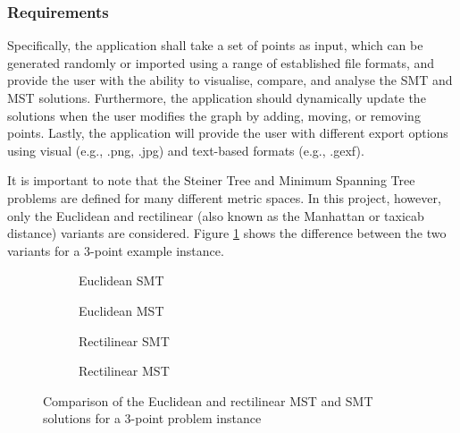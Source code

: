 \documentclass{l4proj}
\begin{document}
\subsubsection{Requirements}
Specifically, the application shall take a set of points as input, which can be generated randomly or imported using a range of established file formats, and provide the user with the ability to visualise, compare, and analyse the SMT and MST solutions.
Furthermore, the application should dynamically update the solutions when the user modifies the graph by adding, moving, or removing points.
Lastly, the application will provide the user with different export options using visual (e.g., .png, .jpg) and text-based formats (e.g., .gexf).

It is important to note that the Steiner Tree and Minimum Spanning Tree problems are defined for many different metric spaces. In this project, however, only the Euclidean and rectilinear (also known as the Manhattan or taxicab distance) variants are considered. Figure \ref{fig:mst_rmst_3point} shows the difference between the two variants for a 3-point example instance.

\begin{figure}[htb]
    \begin{subfigure}[b]{0.24\textwidth}
        \centering
        
        \caption{Euclidean SMT}
    \end{subfigure}
    \begin{subfigure}[b]{0.24\textwidth}
        \centering
        
        \caption{Euclidean MST}
    \end{subfigure}
    \begin{subfigure}[b]{0.24\textwidth}
        \centering
        
        \caption{Rectilinear SMT}
    \end{subfigure}
    \begin{subfigure}[b]{0.24\textwidth}
        \centering
        
        \caption{Rectilinear MST}
    \end{subfigure}

    \caption{Comparison of the Euclidean and rectilinear MST and SMT solutions for a 3-point problem instance}
    \label{fig:mst_rmst_3point}
\end{figure}
\end{document}
